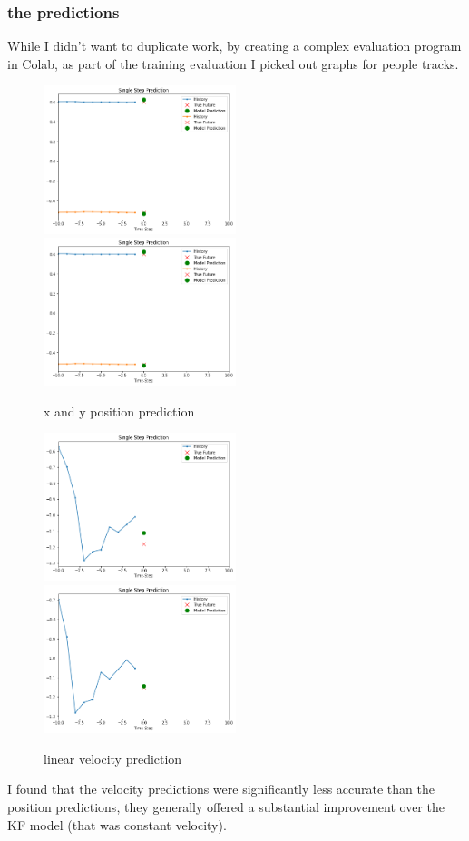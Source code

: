\documentclass[10pt,a4paper]{article}
\begin{document}
\subsubsection{the predictions}
While I didn't want to duplicate work, by creating a complex evaluation program in Colab, as part of the training evaluation I picked out graphs for people tracks.
\begin{figure}[H]
\caption{x and y position prediction} 
\includegraphics[width=0.5\textwidth]{../graphs/xy_val_one.png}
\includegraphics[width=0.5\textwidth]{../graphs/xy_val_two.png}
\end{figure}

\begin{figure}[H]
\caption{linear velocity prediction} 
\includegraphics[width=0.5\textwidth]{../graphs/vel_val_one.png}
\includegraphics[width=0.5\textwidth]{../graphs/vel_val_two.png}
\end{figure}
I found that the velocity predictions were significantly less accurate than the position predictions, they generally offered a substantial improvement over the KF model (that was constant velocity). 
\end{document}
